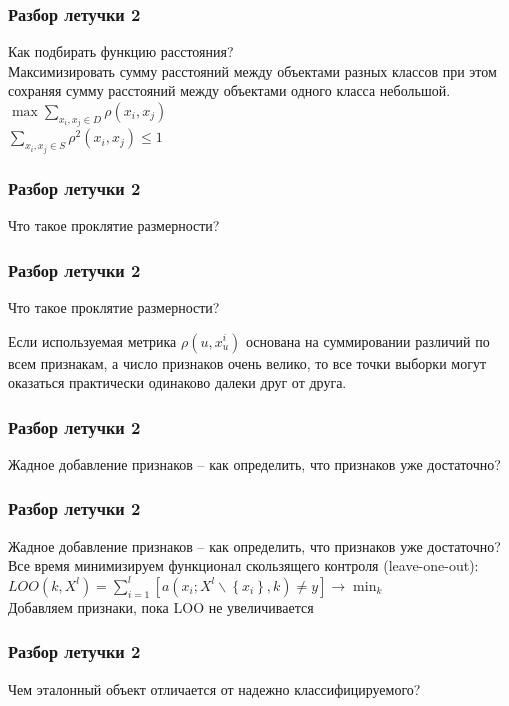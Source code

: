 \documentclass[12pt]{beamer}
\begin{document}
\begin{frame}\frametitle{Разбор летучки 2}
Как подбирать функцию расстояния?\\
\vspace{5mm}
Максимизировать сумму расстояний между объектами разных классов
при этом сохраняя сумму расстояний между объектами одного класса небольшой.\\
\vspace{8mm}
${\max \sum_{x_i, x_j \in D} \rho(x_i, x_j) }$\\
\vspace{8mm}
${\sum_{x_i, x_j \in S} \rho^2(x_i, x_j) \leq 1 }$
\end{frame}
 
\begin{frame}\frametitle{Разбор летучки 2}
Что такое проклятие размерности?
\end{frame}

\begin{frame}\frametitle{Разбор летучки 2}
Что такое проклятие размерности?\\
\vspace{5mm}

Если используемая метрика
${\rho(u, x_u^i)}$
основана на суммировании различий по всем признакам, а число признаков очень велико,
то все точки выборки могут оказаться практически одинаково
далеки друг от друга.\\
\end{frame}

\begin{frame}\frametitle{Разбор летучки 2}
Жадное добавление признаков -- как определить, что признаков уже достаточно?
\end{frame}

\begin{frame}\frametitle{Разбор летучки 2}
Жадное добавление признаков -- как определить, что признаков уже достаточно?\\
\vspace{5mm}
Все время минимизируем функционал скользящего контроля (leave-one-out):\\
${LOO(k, X^l) = \sum\limits_{i=1}^l [a(x_i; X^l \backslash \left\{x_i\right\}, k) \neq y] \rightarrow \min_k}$\\
Добавляем признаки, пока LOO не увеличивается
\end{frame}

\begin{frame}\frametitle{Разбор летучки 2}
Чем эталонный объект отличается от надежно классифицируемого?\\
\end{frame}
\end{document}
